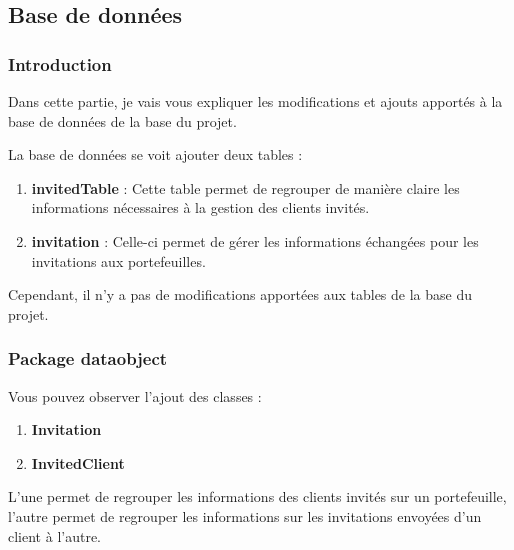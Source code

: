 \subsection{Base de données}

\subsubsection{Introduction}

\begin{flushleft}
Dans cette partie, je vais vous expliquer les modifications et ajouts apportés à la base de données de la base du projet. 
\end{flushleft}

\begin{flushleft}
La base de données se voit ajouter deux tables :
\end{flushleft}

\begin{enumerate}
\item \textbf{invitedTable} :\newline
Cette table permet de regrouper de manière claire les informations nécessaires à la gestion des clients invités.
\item \textbf{invitation} :\newline
Celle-ci permet de gérer les informations échangées pour les invitations aux portefeuilles.
\end{enumerate}

\begin{flushleft}
Cependant, il n'y a pas de modifications apportées aux tables de la base du projet.
\end{flushleft}

\newpage

\subsubsection{Package dataobject}

\begin{flushleft}
Vous pouvez observer l'ajout des classes :
\end{flushleft}
\begin{enumerate}[-]
\item \textbf{Invitation}
\item \textbf{InvitedClient}
\end{enumerate}

\begin{flushleft}
L'une permet de regrouper les informations des clients invités sur un portefeuille, l'autre permet de regrouper les informations sur les invitations envoyées d'un client à l'autre.
\end{flushleft}

